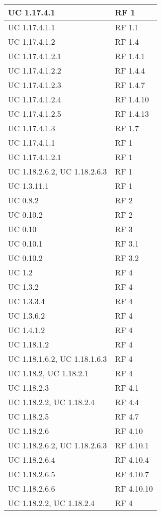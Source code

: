 {\begin{longtable} [c]{| p{4cm} | p{4cm} |}
 \hline 
UC 1.17.4.1 & RF 1\\ 
 \hline 
UC 1.17.4.1.1 & RF 1.1\\ 
 \hline 
UC 1.17.4.1.2 & RF 1.4\\ 
 \hline 
UC 1.17.4.1.2.1 & RF 1.4.1\\ 
 \hline 
UC 1.17.4.1.2.2 & RF 1.4.4\\ 
 \hline 
UC 1.17.4.1.2.3 & RF 1.4.7\\ 
 \hline 
UC 1.17.4.1.2.4 & RF 1.4.10\\ 
 \hline 
UC 1.17.4.1.2.5 & RF 1.4.13\\ 
 \hline 
UC 1.17.4.1.3 & RF 1.7\\ 
 \hline 
UC 1.17.4.1.1 & RF 1\\ 
 \hline 
UC 1.17.4.1.2.1 & RF 1\\ 
 \hline 
UC 1.18.2.6.2, UC 1.18.2.6.3 & RF 1\\ 
 \hline 
UC 1.3.11.1 & RF 1\\ 
 \hline 
UC 0.8.2 & RF 2\\ 
 \hline 
UC 0.10.2 & RF 2\\ 
 \hline 
UC 0.10 & RF 3\\ 
 \hline 
UC 0.10.1 & RF 3.1\\ 
 \hline 
UC 0.10.2 & RF 3.2\\ 
 \hline 
UC 1.2 & RF 4\\ 
 \hline 
UC 1.3.2 & RF 4\\ 
 \hline 
UC 1.3.3.4 & RF 4\\ 
 \hline 
UC 1.3.6.2 & RF 4\\ 
 \hline 
UC 1.4.1.2 & RF 4\\ 
 \hline 
UC 1.18.1.2 & RF 4\\ 
 \hline 
UC 1.18.1.6.2, UC 1.18.1.6.3 & RF 4\\ 
 \hline 
UC 1.18.2, UC 1.18.2.1 & RF 4\\ 
 \hline 
UC 1.18.2.3 & RF 4.1\\ 
 \hline 
UC 1.18.2.2, UC 1.18.2.4 & RF 4.4\\ 
 \hline 
UC 1.18.2.5 & RF 4.7\\ 
 \hline 
UC 1.18.2.6 & RF 4.10\\ 
 \hline 
UC 1.18.2.6.2, UC 1.18.2.6.3 & RF 4.10.1\\ 
 \hline 
UC 1.18.2.6.4 & RF 4.10.4\\ 
 \hline 
UC 1.18.2.6.5 & RF 4.10.7\\ 
 \hline 
UC 1.18.2.6.6 & RF 4.10.10\\ 
 \hline 
UC 1.18.2.2, UC 1.18.2.4 & RF 4\\ 

\end{longtable}}

